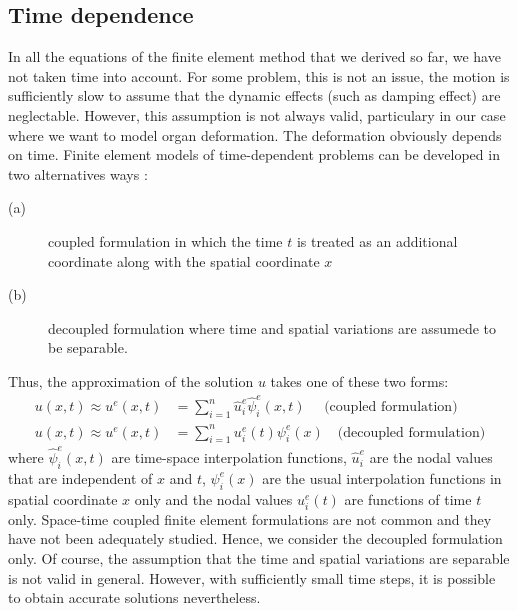 	\subsection{Time dependence}
In all the equations of the finite element method that we derived so far, we have not taken time into account. For some problem, this is not an issue, the motion is sufficiently slow to assume that the dynamic effects (such as damping effect) are neglectable. However, this assumption is not always valid, particulary in our case where we want to model organ deformation. The deformation obviously depends on time. Finite element models of time-dependent problems can be developed in two alternatives ways \citep{Reddy93}:
\begin{description}
\item[(a)] coupled formulation in which the time $ t $ is treated as an additional coordinate along with the spatial coordinate $ x $
\item[(b)] decoupled formulation where time and spatial variations are assumede to be separable.
\end{description}
Thus, the approximation of the solution $ u $ takes one of these two forms:
\begin{align}
u(x, t) \approx u^e(x, t) &= \sum_{i=1}^n \hat{u}^e_i \hat{\psi}^e_i(x, t)  \quad \text{ (coupled formulation)} \label{chap3:approxTime1}\\
u(x, t) \approx u^e(x, t) &= \sum_{i=1}^n u^e_i(t) \psi^e_i(x) \quad \text{(decoupled formulation)} \label{chap3:approxTime2}
\end{align}
where $ \hat{\psi}^e_i(x, t) $ are time-space interpolation functions, $ \hat{u}^e_i $ are the nodal values that are independent of $ x $ and $ t $, $ \psi^e_i(x) $ are the usual interpolation functions in spatial coordinate $ x $ only and the nodal values $ u^e_i(t) $ are functions of time $ t $ only. Space-time coupled finite element formulations are not common and they have not been adequately studied. Hence, we consider the decoupled formulation only. Of course, the assumption that the time and spatial variations are separable is not valid in general. However, with sufficiently small time steps, it is possible to obtain accurate solutions nevertheless. 

	
